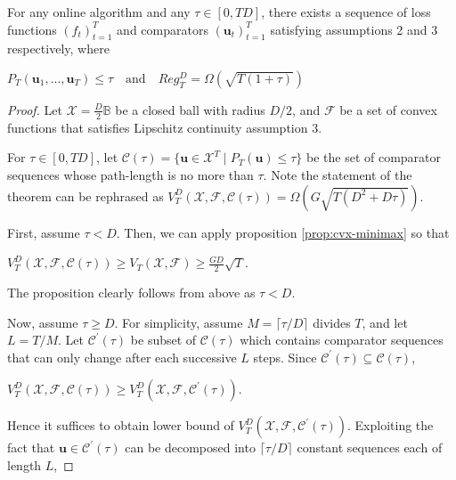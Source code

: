 \documentclass[12pt, a4paper]{report}
\begin{document}
\begin{thm} \label{thm:lower-bound-dynamic-ogd}
    For any online algorithm and any $\tau \in [0, TD]$, there exists a sequence of loss functions $(f_t)_{t=1}^{T}$ and comparators $(\mathbf{u}_t)_{t=1}^{T}$ satisfying assumptions 2 and 3 respectively, where
\begin{center}
    $P_T(\mathbf{u}_1, ..., \mathbf{u}_T) \leq \tau \quad \text{and} \quad Reg_T^{D} = \Omega(\sqrt{T(1 + \tau)})$
\end{center}
\end{thm}
\begin{proof}
Let $\mathcal{X} = \frac{D}{2}\mathbb{B}$ be a closed ball with radius $D/2$, and $\mathcal{F}$ be a set of convex functions that satisfies Lipschitz continuity assumption 3. 

For $\tau \in [0, TD]$, let $\mathcal{C}(\tau) = \{\mathbf{u} \in \mathcal{X}^T \mid P_T(\mathbf{u}) \leq \tau \}$ be the set of comparator sequences whose path-length is no more than $\tau$. Note the statement of the theorem can be rephrased as $V_T^D(\mathcal{X}, \mathcal{F}, \mathcal{C}(\tau)) = \Omega(G\sqrt{T(D^2 + D\tau)})$.  

First, assume $\tau < D$. Then, we can apply proposition \ref{prop:cvx-minimax} so that 
\begin{center}
    $\displaystyle V_T^D(\mathcal{X}, \mathcal{F}, \mathcal{C}(\tau)) \geq V_T(\mathcal{X}, \mathcal{F}) \geq \frac{GD}{2}\sqrt{T}$.
\end{center}
The proposition clearly follows from above as $\tau < D$.

Now, assume $\tau \geq D$. For simplicity, assume $M = \lceil \tau / D \rceil$ divides $T$, and let $L = T / M$.
Let $\mathcal{C}^\prime(\tau)$ be subset of $\mathcal{C}(\tau)$ which contains comparator sequences that can only change after each successive $L$ steps. Since $\mathcal{C}^\prime(\tau) \subseteq \mathcal{C}(\tau)$,
\begin{center}
    $\displaystyle V_T^D(\mathcal{X}, \mathcal{F}, \mathcal{C}(\tau)) \geq V_T^D(\mathcal{X}, \mathcal{F}, \mathcal{C}^\prime(\tau))$.
\end{center}
Hence it suffices to obtain lower bound of $V_T^D(\mathcal{X}, \mathcal{F}, \mathcal{C}^\prime(\tau))$. Exploiting the fact that $\mathbf{u} \in \mathcal{C}^\prime(\tau)$ can be decomposed into $\lceil \tau / D \rceil$ constant sequences each of length $L$, 


\end{proof}
\end{document}
